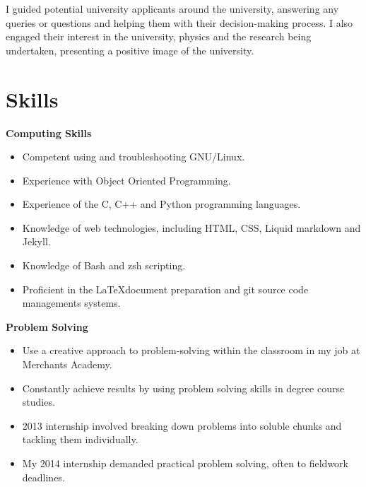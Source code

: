 \documentclass[11pt,a4paper,sans]{moderncv}
\begin{document}
I guided potential university applicants around the university, answering any
queries or questions and helping them with their decision-making process. I also
engaged their interest in the university, physics and the research being
undertaken, presenting a positive image of the university.
    
\vspace{2pt}

\section{Skills}

{\large\textbf{Computing Skills}}

\begin{itemize}
\item Competent using and troubleshooting GNU/Linux.
\item Experience with Object Oriented Programming.
\item Experience of the C, C++ and Python programming languages.
\item Knowledge of web technologies, including HTML, CSS, Liquid markdown and
    Jekyll.
\item Knowledge of Bash and zsh scripting.
\item Proficient in the \LaTeX \space document preparation and git source
    code managements systems.
\end{itemize}

\vspace{1em}

{\large\textbf{Problem Solving}}

\begin{itemize}
\item Use a creative approach to problem-solving within the classroom in my job
    at Merchants Academy.
\item Constantly achieve results by using problem solving skills in degree
    course studies.
\item 2013 internship involved breaking down problems into soluble
    chunks and tackling them individually. %
\item My 2014 internship demanded practical problem solving, often to fieldwork
    deadlines.
\end{itemize}

\vspace{1em}
\end{document}
